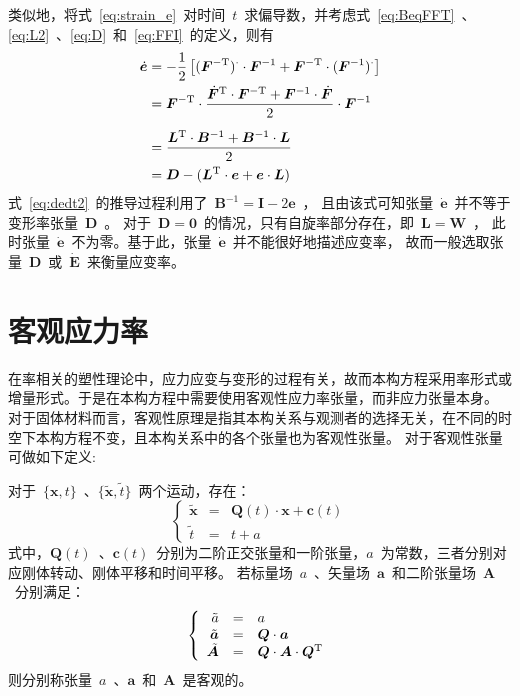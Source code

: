 类似地，将式~\eqref{eq:strain_e}~对时间~$t$~求偏导数，并考虑式~\eqref{eq:BeqFFT}~、\eqref{eq:L2}~、\eqref{eq:D}~和~\eqref{eq:FFI}~的定义，则有
\begin{subequations}\label{eq:dedt}
	\begin{align}
	\dot{\bm{e}} & = -\frac{1}{2} \left[ (\bm{F}^{-\mathrm{T}})^{\cdotp} \cdot \bm{F}^{-1} + \bm{F}^{-\mathrm{T}} \cdot (\bm{F}^{-1})^{\cdotp} \right] \\
	             & = \bm{F}^{-\mathrm{T}} \cdot \frac{ \dot{\bm{F}}^{\mathrm{T}} \cdot \bm{F}^{-\mathrm{T}} + \bm{F}^{-1} \cdot \dot{\bm{F}} }{2} \cdot \bm{F}^{-1} \\[5pt]
				 & = \frac{ \bm{L}^{\mathrm{T}} \cdot \bm{B}^{-1} + \bm{B}^{-1} \cdot \bm{L} }{2} \\
				 & = \bm{D} - (\bm{L}^{\mathrm{T}} \cdot \bm{e} + \bm{e} \cdot \bm{L}) \label{eq:dedt2}
	\end{align}
\end{subequations}
式~\eqref{eq:dedt2}~的推导过程利用了~$\bm{B}^{-1} = \bm{I} - 2\bm{e}$~，
且由该式可知张量~$\dot{\bm{e}}$~并不等于变形率张量~$\bm{D}$~。
对于~$\bm{D}=\bm{0}$~的情况，只有自旋率部分存在，即~$\bm{L}=\bm{W}$~，
此时张量~$\dot{\bm{e}}$~不为零。基于此，张量~$\dot{\bm{e}}$~并不能很好地描述应变率，
故而一般选取张量~$\bm{D}$~或~$\dot{\bm{E}}$~来衡量应变率。

\section{客观应力率}
在率相关的塑性理论中，应力应变与变形的过程有关，故而本构方程采用率形式或增量形式。于是在本构方程中需要使用客观性应力率张量，而非应力张量本身。
对于固体材料而言，客观性原理是指其本构关系与观测者的选择无关，在不同的时空下本构方程不变，且本构关系中的各个张量也为客观性张量\cite{kang}。
对于客观性张量可做如下定义:

对于~$\{ \bm{x},t \}$~、$\{ \tilde{\bm{x}},\tilde{t} \}$~两个运动，存在：
\begin{equation}
	\left\{\begin{array}{rcl}
	\tilde{\bm{x}} & = & \bm{Q}(t) \cdot \bm{x} +\bm{c}(t) \\
	     \tilde{t} & = & t + a
	\end{array}\right.
\end{equation}
式中，$\bm{Q}(t)$~、$\bm{c}(t)$~分别为二阶正交张量和一阶张量，$a$~为常数，三者分别对应刚体转动、刚体平移和时间平移。
若标量场~$a$~、矢量场~$\bm{a}$~和二阶张量场~$\bm{A}$~分别满足：
\begin{equation}\label{eq:objective1}
	\left\{\begin{array}{rcl}
	     \tilde{a} & = & a \\
	\tilde{\bm{a}} & = & \bm{Q} \cdot \bm{a} \\
	\tilde{\bm{A}} & = & \bm{Q} \cdot \bm{A} \cdot \bm{Q}^{\mathrm{T}}
	\end{array}\right.
\end{equation}
则分别称张量~$a$~、$\bm{a}$~和~$\bm{A}$~是客观的。

